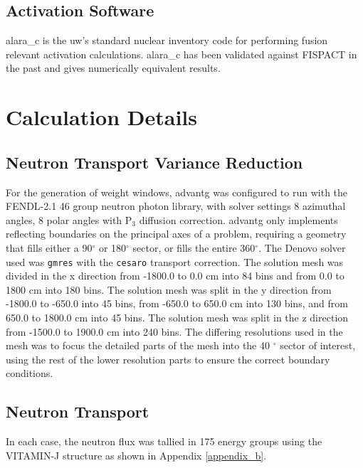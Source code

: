 \documentclass[12pt]{article}
\begin{document}
\subsection{Activation Software}
\gls{alara_c} is the \gls{uw}'s standard nuclear inventory code for performing
fusion relevant activation calculations. \gls{alara_c} has been validated against 
FISPACT \cite{fispact} in the past and gives numerically equivalent results. 

\newpage
\clearpage
\section{Calculation Details}

\subsection{Neutron Transport Variance Reduction}

For the generation of weight windows, \gls{advantg} was configured to run
with the FENDL-2.1 46 group neutron photon library, with solver settings
8 azimuthal angles, 8 polar angles with P$_3$ diffusion correction. 
\gls{advantg} only implements reflecting boundaries on the principal axes of a 
problem, requiring a geometry that fills either a 90$^{\circ}$ or 180$^{\circ}$ 
sector, or fills the entire 360$^{\circ}$.  The Denovo
solver used was \texttt{gmres} with the \texttt{cesaro} transport correction. 
The solution mesh was divided in the x direction from -1800.0 to 0.0 cm into 84 bins and 
from 0.0 to 1800 cm into 180 bins. The solution mesh was split in the y direction from 
-1800.0 to -650.0 into 45 bins, from -650.0 to 650.0 cm into 130 bins, and from 650.0 
to 1800.0 cm into 45 bins. The solution mesh was split in the z direction from -1500.0
to 1900.0 cm into 240 bins. The differing resolutions used in the mesh was to
focus the detailed parts of the mesh into the 40 $^{\circ}$ sector of interest,
using the rest of the lower resolution parts to ensure the correct boundary conditions.

\subsection{Neutron Transport}

In each case, the neutron flux was tallied in 175 energy groups using the
VITAMIN-J structure \cite{vitaminj} as shown in Appendix \ref{appendix_b}.
\end{document}
